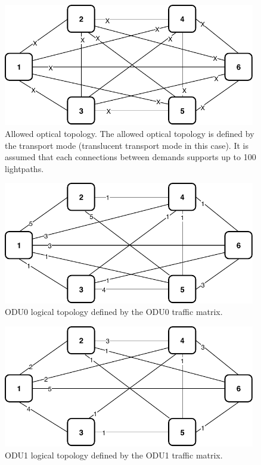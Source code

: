 \newpage
\begin{figure}[h!]
\centering
\includegraphics[width=11cm]{sdf/ilp/translucent_survivability/figures/allowed_optical_topology}
\caption{Allowed optical topology. The allowed optical topology is defined by the transport mode (translucent transport mode in this case). It is assumed that each connections between demands supports up to 100 lightpaths.}
\label{allowed3_optical_low}
\end{figure}

\begin{figure}[h!]
\centering
\includegraphics[width=11cm]{sdf/ilp/translucent_survivability/figures/logical_topology_ODU0_low}
\caption{ODU0 logical topology defined by the ODU0 traffic matrix.}
\label{logical3_ODU0_low}
\end{figure}

\begin{figure}[h!]
\centering
\includegraphics[width=11cm]{sdf/ilp/translucent_survivability/figures/logical_topology_ODU1_low}
\caption{ODU1 logical topology defined by the ODU1 traffic matrix.}
\label{logical3_ODU1_low}
\end{figure}

